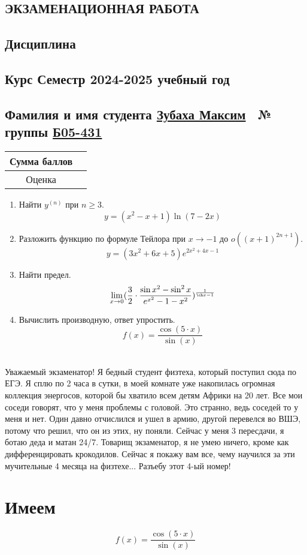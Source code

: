 \documentclass{article}
\begin{document}
\begin{Large}
\begin{onehalfspace}
\begin{center}
\section*{\huge ЭКЗАМЕНАЦИОННАЯ РАБОТА}
\subsection*{\large Дисциплина }
\subsection*{Курс  Семестр  2024-2025 учебный год}
\subsection*{Фамилия и имя студента \underline{Зубаха Максим}\ \hspace{2cm} № группы \underline{Б05-431}}
\begin{tabular}{|c|c|}
\hline 
Сумма баллов & \hspace{8cm} \\ 
\hline 
Оценка & \hspace{8cm} \\ 
\hline 
\end{tabular} 
\vspace{1cm} 
\hline 
\end{center} 
\begin{large} 
\begin{enumerate} 
\item Найти $y^{(n)}$ при $n \geq 3$. $$y = (x^2 - x + 1)\ln(7-2x)$$ 
\hline 
\item Разложить функцию по формуле Тейлора при $x \rightarrow -1$ до $o((x + 1)^{2n+1})$. $$y = (3x^2 + 6x + 5)e^{2x^2+4x-1}$$ 
\hline 
\item Найти предел. $$\lim\limits_{x \rightarrow 0}(\frac{3}{2} \cdot \frac{\sin{x^2} - \sin^2 x}{e^{x^2} - 1 - x^2})^{\frac{1}{\ch x - 1}}$$ 
\hline 
\item Вычислить производную, ответ упростить. 
$$ f(x) = \frac{\cos(5 \cdot x)}{\sin(x)}$$\ \hline \
\end{enumerate}
\end{large}
Уважаемый экзаменатор! Я бедный студент физтеха, который поступил сюда по ЕГЭ. Я сплю по 2 часа в сутки, в моей комнате уже накопилась огромная коллекция энергосов, которой бы хватило всем детям Африки на 20 лет. Все мои соседи говорят, что у меня проблемы с головой. Это странно, ведь соседей то у меня и нет. Один давно отчислился и ушел в армию, другой перевелся во ВШЭ, потому что решил, что он из этих, ну поняли. Сейчас у меня 3 пересдачи, я ботаю деда и матан 24/7. Товарищ экзаменатор, я не умею ничего, кроме как дифференцировать крокодилов. Сейчас я покажу вам все, чему научился за эти мучительные 4 месяца на физтехе... Разъебу этот 4-ый номер!
\newpage \section*{Имеем}$$ f(x) = \frac{\cos(5 \cdot x)}{\sin(x)}$$

\end{onehalfspace}
\end{Large}
\end{document}
